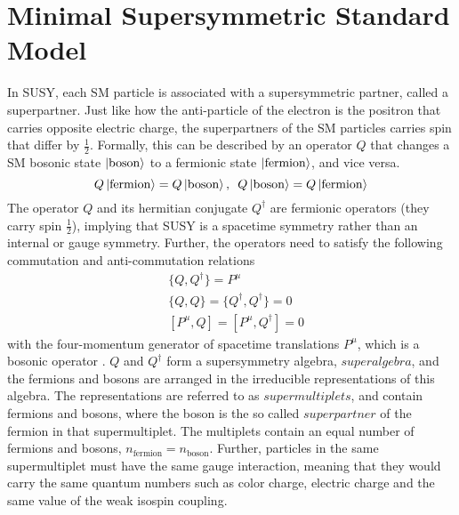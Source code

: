 \section{Minimal Supersymmetric Standard Model}\label{sec:mssm}
\noindent\justify
In SUSY, each SM particle is associated with a supersymmetric partner, called a superpartner.
Just like how the anti-particle of the electron is the positron that carries opposite electric charge, the superpartners of the SM particles carries spin that differ by $\frac{1}{2}$. 
Formally, this can be described by an operator $Q$ that changes a SM bosonic state $\ket{\mathrm{boson}}$ to a fermionic state $\ket{\mathrm{fermion}}$, and vice versa. 
\begin{equation}
Q\ket{\mathrm{fermion}}=Q\ket{\mathrm{boson}}  ,\,\,\,Q\ket{\mathrm{boson}}=Q\ket{\mathrm{fermion}}
\end{equation}
The operator $Q$ and its hermitian conjugate $Q^{\dagger}$ are fermionic operators (they carry spin $\frac{1}{2}$), implying that SUSY is a spacetime symmetry rather than an internal or gauge symmetry. 
Further, the operators need to satisfy the following commutation and anti-commutation relations
\begin{align}
&\{Q,Q^{\dagger}\}=P^{\mu}\\
&\{Q,Q\}=\{Q^{\dagger},Q^{\dagger}\}=0\\
&[P^{\mu},Q]=[P^{\mu},Q^{\dagger}]=0
\end{align} 
with the four-momentum generator of spacetime translations $P^{\mu}$, which is a bosonic operator \cite{Martin:1997ns}.
$Q$ and $Q^{\dagger}$ form a supersymmetry algebra, $superalgebra$, and the fermions and bosons are arranged in the irreducible representations of this algebra. 
The representations are referred to as $supermultiplets$, and contain fermions and bosons, where the boson is the so called $superpartner$ of the fermion in that supermultiplet. 
The multiplets contain an equal number of fermions and bosons, $n_{\mathrm{fermion}} = n_{\mathrm{boson}}$. 
Further, particles in the same supermultiplet must have the same gauge interaction, meaning that they would carry the same quantum numbers such as color charge, electric charge and the same value of the weak isospin coupling. 
